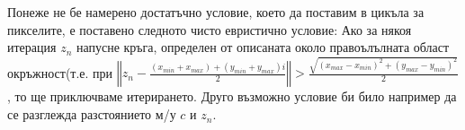\begin{Large}
\begin{enumerate}
 Понеже не бе намерено достатъчно условие, което да поставим в цикъла за пикселите, е поставено следното чисто евристично условие: Ако за някоя итерация $z_n$ напусне кръга, определен от описаната около правоълълната област окръжност(т.е. при $\left\Vert z_n -\frac{(x_{min}+x_{max})+(y_{min}+y_{max})i}{2}\right\Vert > \frac{\sqrt{(x_{max}-x_{min})^2+(y_{max}-y_{min})^2}}{2}$ , то ще приключваме итерирането. Друго възможно условие би било например да се разглежда разстоянието м/у $c$ и $z_n$. 
 
 \end{enumerate}

\end{Large}
 